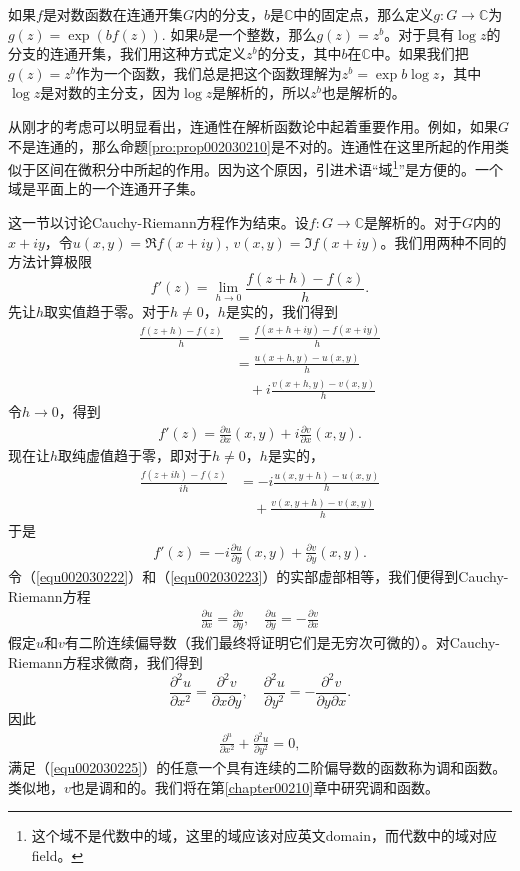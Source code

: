 如果$f$是对数函数在连通开集$G$内的分支，$b$是$\mathbb{C}$中的固定点，那么定义$g: G \to \mathbb{C}$为$g(z) = \exp{(bf(z))}$. 如果$b$是一个整数，那么$g(z) = z^b$。对于具有$\log{z}$的分支的连通开集，我们用这种方式定义$z^b$的分支，其中$b$在$\mathbb{C}$中。如果我们把$g(z)=z^b$作为一个函数，我们总是把这个函数理解为$z^b = \exp{b\log{z}}$，其中$\log{z}$是对数的主分支，因为$\log{z}$是解析的，所以$z^b$也是解析的。

从刚才的考虑可以明显看出，连通性在解析函数论中起着重要作用。例如，如果$G$不是连通的，那么命题\ref{pro:prop002030210}是不对的。连通性在这里所起的作用类似于区间在微积分中所起的作用。因为这个原因，引进术语“域\footnote{这个域不是代数中的域，这里的域应该对应英文domain，而代数中的域对应field。}”是方便的。一个域是平面上的一个连通开子集。

这一节以讨论Cauchy-Riemann方程作为结束。设$f: G \to \mathbb{C}$是解析的。对于$G$内的$x + iy$，令$u(x, y) = \Re{f(x + iy)}$, $v(x, y) = \Im{f(x + iy)}$。我们用两种不同的方法计算极限
\[
f'(z) = \lim_{h \to 0}{\frac{f(z+h) - f(z)}{h}}.
\]
先让$h$取实值趋于零。对于$h \neq 0$，$h$是实的，我们得到
\[
\begin{aligned}
\frac{f(z+h) - f(z)}{h} &= \frac{f(x+ h + iy) - f(x + iy)}{h}\\
&= \frac{u(x+h, y) - u(x, y)}{h} \\
&\quad + i\frac{v(x+h, y) - v(x, y)}{h}
\end{aligned}
\]
令$h \to 0$，得到
\begin{gather}\label{equ002030222}
f'(z) = \frac{\partial{u}}{\partial{x}}(x, y) + i\frac{\partial{v}}{\partial{x}}(x, y).
\end{gather}
现在让$h$取纯虚值趋于零，即对于$h \neq 0$，$h$是实的，
\[
\begin{aligned}
\frac{f(z+ih) - f(z)}{ih} &= -i\frac{u(x, y+h) - u(x, y)}{h} \\
&\quad + \frac{v(x, y+h) - v(x, y)}{h}
\end{aligned}
\]
于是
\begin{gather}\label{equ002030223}
f'(z) = -i\frac{\partial{u}}{\partial{y}}(x, y) + \frac{\partial{v}}{\partial{y}}(x, y).
\end{gather}
令（\ref{equ002030222}）和（\ref{equ002030223}）的实部虚部相等，我们便得到Cauchy-Riemann方程
\begin{gather}\label{equ002030224}
\frac{\partial{u}}{\partial{x}} = \frac{\partial{v}}{\partial{y}}, \quad \frac{\partial{u}}{\partial{y}} = -\frac{\partial{v}}{\partial{x}}
\end{gather}
假定$u$和$v$有二阶连续偏导数（我们最终将证明它们是无穷次可微的）。对Cauchy-Riemann方程求微商，我们得到
\[
\frac{\partial^2{u}}{\partial{x^2}} = \frac{\partial^2{v}}{\partial{x}\partial{y}}, \quad
\frac{\partial^2{u}}{\partial{y^2}} = -\frac{\partial^2{v}}{\partial{y}\partial{x}}.
\]
因此
\begin{gather}\label{equ002030225}
\frac{\partial^{u}}{\partial{x^2}} + \frac{\partial^2{u}}{\partial{y^2}} = 0,
\end{gather}
满足（\ref{equ002030225}）的任意一个具有连续的二阶偏导数的函数称为调和函数。类似地，$v$也是调和的。我们将在第\ref{chapter00210}章中研究调和函数。

